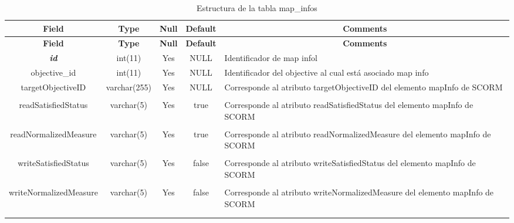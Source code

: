 %
%
\begin{longtable}{c c c c l}
	\multicolumn{1}{c}{\textbf{Field}} &
	\multicolumn{1}{c}{\textbf{Type}} &
	\multicolumn{1}{c}{\textbf{Null}} &
	\multicolumn{1}{c}{\textbf{Default}} &
	\multicolumn{1}{c}{\textbf{Comments}} \\ \hline \hline
\endfirsthead
	\multicolumn{1}{c}{\textbf{Field}} &
	\multicolumn{1}{c}{\textbf{Type}} &
	\multicolumn{1}{c}{\textbf{Null}} &
	\multicolumn{1}{c}{\textbf{Default}} &
	\multicolumn{1}{c}{\textbf{Comments}} \\ \hline \hline
\endhead \endfoot
	\textbf{\textit{id}} & int(11)  & Yes & NULL & \parbox[t]{0.35\textwidth}{Identificador de map info}l\\ \hline 
	objective\_id & int(11) & Yes & NULL & \parbox[t]{0.35\textwidth}{Identificador del objective al cual está asociado map info}\\ \hline 
	targetObjectiveID & varchar(255) & Yes & NULL & \parbox[t]{0.35\textwidth}{Corresponde al atributo targetObjectiveID del elemento mapInfo de SCORM} \\ \\  \hline
	readSatisfiedStatus & varchar(5) & Yes & true & \parbox[t]{0.35\textwidth}{Corresponde al atributo readSatisfiedStatus del elemento mapInfo de SCORM} \\ \\  \hline
	readNormalizedMeasure & varchar(5) & Yes & true & \parbox[t]{0.35\textwidth}{Corresponde al atributo readNormalizedMeasure del elemento mapInfo de SCORM} \\ \\  \hline
	writeSatisfiedStatus & varchar(5) & Yes & false & \parbox[t]{0.35\textwidth}{Corresponde al atributo writeSatisfiedStatus del elemento mapInfo de SCORM} \\ \\  \hline
	writeNormalizedMeasure & varchar(5) & Yes & false & \parbox[t]{0.35\textwidth}{Corresponde al atributo writeNormalizedMeasure del elemento mapInfo de SCORM} \\ \\  \hline
 \caption{Estructura de la tabla map\_infos} \label{tab:scorm_map_infos-structure} \\
\end{longtable}

